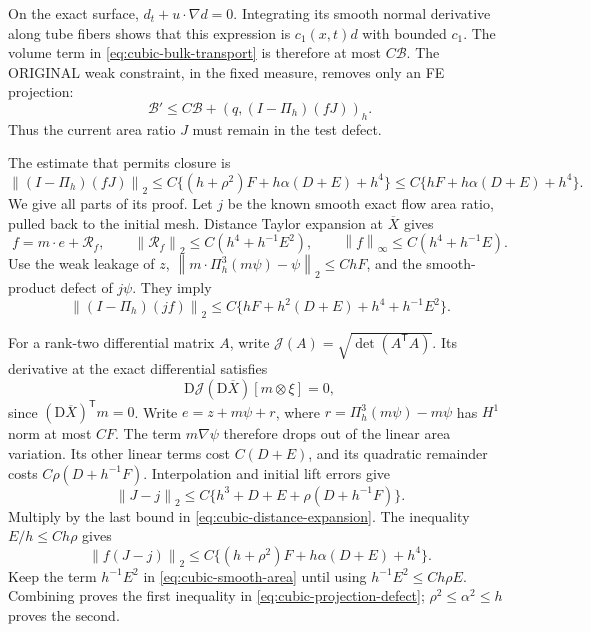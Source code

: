 \documentclass[11pt,a4paper]{article}
\numberwithin{equation}{section}
\theoremstyle{remark}
\newcommand{\norm}[1]{\left\lVert #1\right\rVert}
\begin{document}
On the exact surface, \(d_t+u\cdot\nabla d=0\). Integrating its smooth
normal derivative along tube fibers shows that this expression is
\(c_1(x,t)d\) with bounded \(c_1\). The volume term in
\eqref{eq:cubic-bulk-transport} is therefore at most \(C\mathcal B\).
The ORIGINAL weak constraint, in the fixed measure, removes only an
FE projection:
\begin{equation}\label{eq:cubic-bulk-weak}
 \mathcal B'\leq C\mathcal B+(q,(I-\Pi_h)(fJ))_h.
\end{equation}
Thus the current area ratio \(J\) must remain in the test defect.

The estimate that permits closure is
\begin{equation}\label{eq:cubic-projection-defect}
 \norm{(I-\Pi_h)(fJ)}_2
 \leq C\{(h+\rho^2)F+h\alpha(D+E)+h^4\}
 \leq C\{hF+h\alpha(D+E)+h^4\}.
\end{equation}
We give all parts of its proof. Let \(j\) be the known smooth exact
flow area ratio, pulled back to the initial mesh. Distance Taylor
expansion at \(\overline X\) gives
\begin{equation}\label{eq:cubic-distance-expansion}
 f=m\cdot e+\mathcal R_f,\qquad
 \norm{\mathcal R_f}_2\leq C(h^4+h^{-1}E^2),\qquad
 \norm f_\infty\leq C(h^4+h^{-1}E).
\end{equation}
Use the weak leakage of \(z\),
\(\norm{m\cdot\Pi_h^3(m\psi)-\psi}_2\leq ChF\), and the
smooth-product defect of \(j\psi\). They imply
\begin{equation}\label{eq:cubic-smooth-area}
 \norm{(I-\Pi_h)(jf)}_2
      \leq C\{hF+h^2(D+E)+h^4+h^{-1}E^2\}.
\end{equation}

For a rank-two differential matrix \(A\), write
\(\mathcal J(A)=\sqrt{\det(A^{\mathsf T}A)}\). Its derivative at the
exact differential satisfies
\begin{equation}\label{eq:cubic-area-cancellation}
 \mathrm D\mathcal J(\mathrm D\overline X)[m\otimes\xi]=0,
\end{equation}
since \((\mathrm D\overline X)^{\mathsf T}m=0\).
Write \(e=z+m\psi+r\), where
\(r=\Pi_h^3(m\psi)-m\psi\) has \(H^1\) norm at most \(CF\).
The term \(m\nabla\psi\) therefore drops out of the linear area
variation. Its other linear terms cost \(C(D+E)\), and its quadratic
remainder costs \(C\rho(D+h^{-1}F)\). Interpolation and initial lift
errors give
\begin{equation}\label{eq:cubic-area-difference}
 \norm{J-j}_2\leq C\{h^3+D+E+\rho(D+h^{-1}F)\}.
\end{equation}
Multiply by the last bound in \eqref{eq:cubic-distance-expansion}.
The inequality \(E/h\leq Ch\rho\) gives
\[
 \norm{f(J-j)}_2
       \leq C\{(h+\rho^2)F+h\alpha(D+E)+h^4\}.
\]
Keep the term \(h^{-1}E^2\) in \eqref{eq:cubic-smooth-area} until using
\(h^{-1}E^2\leq Ch\rho E\). Combining proves the first inequality
in \eqref{eq:cubic-projection-defect}; \(\rho^2\leq\alpha^2\leq h\)
proves the second.
\end{document}
